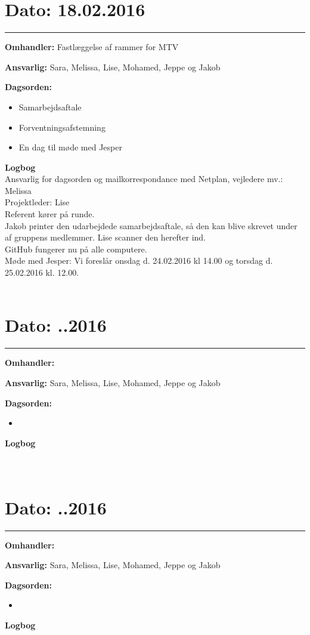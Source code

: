 \section{Dato: 18.02.2016}
\hrule

\textbf{Omhandler:} Fastlæggelse af rammer for MTV 

\textbf{Ansvarlig:} Sara, Melissa, Lise, Mohamed, Jeppe og Jakob

\textbf{Dagsorden:}
\begin{itemize}
	\item Samarbejdsaftale
	\item Forventningsafstemning
	\item En dag til møde med Jesper
\end{itemize}

\textbf{Logbog}
\\
Ansvarlig for dagsorden og mailkorrespondance med Netplan, vejledere mv.: Melissa\\
Projektleder: Lise\\
Referent kører på runde. \\
Jakob printer den udarbejdede samarbejdsaftale, så den kan blive skrevet under af gruppens medlemmer. Lise scanner den herefter ind.\\
GitHub fungerer nu på alle computere. \\
Møde med Jesper: Vi foreslår onsdag d. 24.02.2016 kl 14.00 og torsdag d. 25.02.2016 kl. 12.00.
\\
\\



\section{Dato: ..2016}
\hrule

\textbf{Omhandler:}

\textbf{Ansvarlig:} Sara, Melissa, Lise, Mohamed, Jeppe og Jakob

\textbf{Dagsorden:}
\begin{itemize}
	\item 
\end{itemize}

\textbf{Logbog}
\\
\\ \\



\section{Dato: ..2016}
\hrule

\textbf{Omhandler:} 

\textbf{Ansvarlig:} Sara, Melissa, Lise, Mohamed, Jeppe og Jakob

\textbf{Dagsorden:}
\begin{itemize}
	\item 
\end{itemize}

\textbf{Logbog}
\\
\\ \\




	

